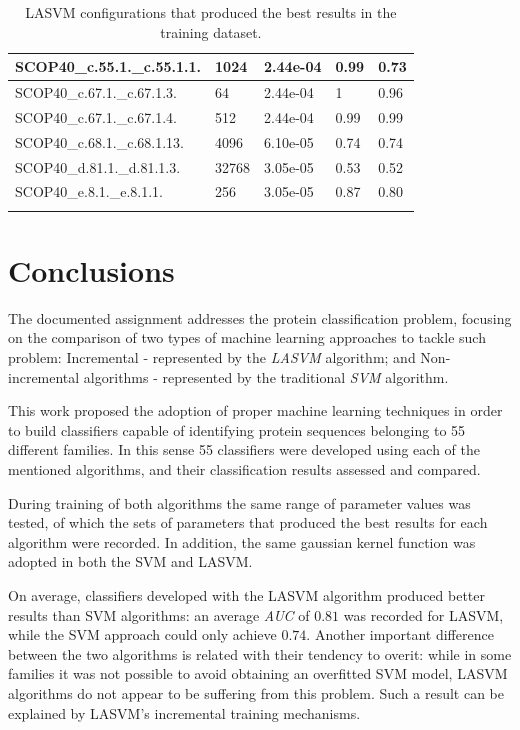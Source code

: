 \documentclass[11pt]{article}
\begin{document}
\begin{longtable}{|p{}|p{}|p{}|p{}|p{}|}
	SCOP40\_c.55.1.\_c.55.1.1.    & 1024    & 2.44e-04  & 0.99  & 0.73 \\ \hline
	
	SCOP40\_c.67.1.\_c.67.1.3.    & 64      & 2.44e-04  & 1     & 0.96 \\ \hline
	
	SCOP40\_c.67.1.\_c.67.1.4.    & 512     & 2.44e-04  & 0.99  & 0.99 \\ \hline
	
	SCOP40\_c.68.1.\_c.68.1.13.   & 4096    & 6.10e-05  & 0.74  & 0.74 \\ \hline
	
	SCOP40\_d.81.1.\_d.81.1.3.    & 32768   & 3.05e-05  & 0.53  & 0.52 \\ \hline
	
	SCOP40\_e.8.1.\_e.8.1.1.      & 256     & 3.05e-05  & 0.87  & 0.80  \\ \hline
	\caption{LASVM configurations that produced the best results in the training dataset.}
	\label{lasvm_results}
\end{longtable}

\section{Conclusions}
\label{conclusions}

The documented assignment addresses the protein classification problem, focusing on the comparison of two types of machine learning approaches to tackle such problem: Incremental - represented by the \emph{LASVM} algorithm; and Non-incremental algorithms - represented by the traditional \emph{SVM} algorithm.

This work proposed the adoption of proper machine learning techniques in order to build classifiers capable of identifying protein sequences belonging to 55 different families. In this sense 55 classifiers were developed using each of the mentioned algorithms, and their classification results assessed and compared.

During training of both algorithms the same range of parameter values was tested, of which the sets of parameters that produced the best results for each algorithm were recorded. In addition, the same gaussian kernel function was adopted in both the SVM and LASVM.

On average, classifiers developed with the LASVM algorithm produced better results than SVM algorithms: an average \emph{AUC} of $0.81$ was recorded for LASVM, while the SVM approach could only achieve $0.74$. Another important difference between the two algorithms is related with their tendency to overit: while in some families it was not possible to avoid obtaining an overfitted SVM model, LASVM algorithms do not appear to be suffering from this problem. Such a result can be explained by LASVM's incremental training mechanisms. 
\end{document}
